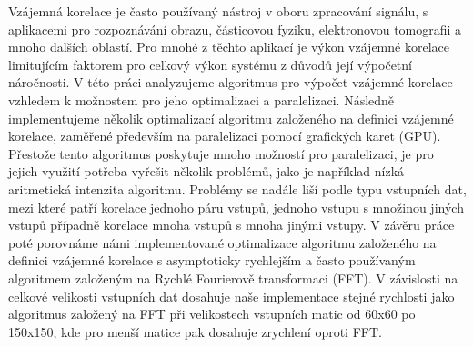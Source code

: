\documentclass[12pt]{report}
\begin{document}

Vzájemná korelace je často používaný nástroj v oboru zpracování signálu, s aplikacemi pro rozpoznávání obrazu, částicovou fyziku, elektronovou tomografii a mnoho dalších oblastí. Pro mnohé z těchto aplikací je výkon vzájemné korelace limitujícím faktorem pro celkový výkon systému z důvodů její výpočetní náročnosti. V této práci analyzujeme algoritmus pro výpočet vzájemné korelace vzhledem k možnostem pro jeho optimalizaci a paralelizaci. Následně implementujeme několik optimalizací algoritmu založeného na definici vzájemné korelace, zaměřené především na paralelizaci pomocí grafických karet (GPU). Přestože tento algoritmus poskytuje mnoho možností pro paralelizaci, je pro jejich využití potřeba vyřešit několik problémů, jako je například nízká aritmetická intenzita algoritmu. Problémy se nadále liší podle typu vstupních dat, mezi které patří korelace jednoho páru vstupů, jednoho vstupu s množinou jiných vstupů případně korelace mnoha vstupů s mnoha jinými vstupy. V závěru práce poté porovnáme námi implementované optimalizace algoritmu založeného na definici vzájemné korelace s asymptoticky rychlejším a často používaným algoritmem založeným na Rychlé Fourierově transformaci (FFT). V závislosti na celkové velikosti vstupních dat dosahuje naše implementace stejné rychlosti jako algoritmus založený na FFT při velikostech vstupních matic od 60x60 po 150x150, kde pro menší matice pak dosahuje zrychlení oproti FFT.
\end{document}
